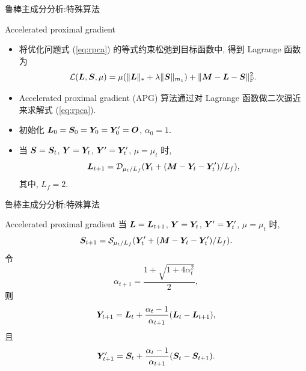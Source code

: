 \documentclass{beamer}
\begin{document}
\begin{frame}{鲁棒主成分分析:特殊算法}
  \begin{block}{Accelerated proximal gradient}
    \begin{itemize}
      \item 将优化问题式 (\ref{eq:rpca}) 的等式约束松弛到目标函数中, 得到 Lagrange 函数为
      \begin{equation}
        \mathcal{L}(\bm{L},\bm{S},\mu)=\mu(\|\bm{L}\|_{*}+\lambda\|\bm{S}\|_{m_1})+\|\bm{M}-\bm{L}-\bm{S}\|_{\text{F}}^2.
      \end{equation}
      \item Accelerated proximal gradient (APG) \cite{lin2009fast} 算法通过对 Lagrange 函数做二次逼近来求解式 (\ref{eq:rpca}).
      \item 初始化 $\bm{L}_0=\bm{S}_0=\bm{Y}_0=\bm{Y}'_0=\bm{O}$, $\alpha_0=1$.
      \item 当 $\bm{S}=\bm{S}_{t}$, $\bm{Y}=\bm{Y}_t$, $\bm{Y}'=\bm{Y}'_t$, $\mu=\mu_t$ 时,
      \begin{equation}
        \bm{L}_{t+1}
        =\mathcal{D}_{\mu_t/L_f}(\bm{Y}_t+(\bm{M}-\bm{Y}_t-\bm{Y}'_t)/L_f),
      \end{equation}
      其中, $L_f=2$.
    \end{itemize}
  \end{block}
\end{frame}

\begin{frame}{鲁棒主成分分析:特殊算法}
  \begin{block}{Accelerated proximal gradient}
    当 $\bm{L}=\bm{L}_{t+1}$, $\bm{Y}=\bm{Y}_t$, $\bm{Y}'=\bm{Y}'_t$, $\mu=\mu_t$ 时,
    \begin{equation}
      \bm{S}_{t+1}
      =\mathcal{S}_{\mu_t/L_f}(\bm{Y}'_t+(\bm{M}-\bm{Y}_t-\bm{Y}'_t)/L_f).
    \end{equation}
    令
    \begin{equation}
      \alpha_{t+1}=\frac{1+\sqrt{1+4\alpha_t^2}}{2},
    \end{equation}
    则
    \begin{equation}
      \bm{Y}_{t+1}=\bm{L}_t+\frac{\alpha_t-1}{\alpha_{t+1}}(\bm{L}_t-\bm{L}_{t+1}),
    \end{equation}
    且
    \begin{equation}
      \bm{Y}'_{t+1}=\bm{S}_t+\frac{\alpha_t-1}{\alpha_{t+1}}(\bm{S}_t-\bm{S}_{t+1}).
    \end{equation}
  \end{block}
\end{frame}
\end{document}
